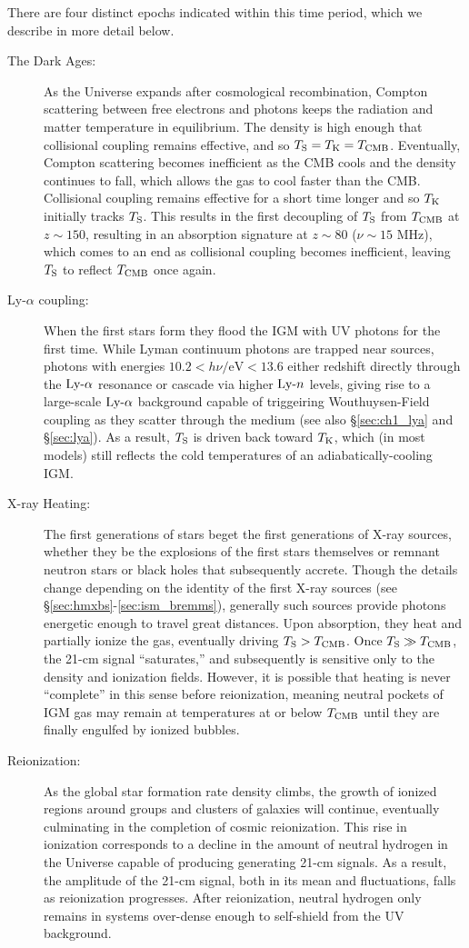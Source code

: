 There are four distinct epochs indicated within this time period, which we describe in more detail below.
\begin{description}
	\item[The Dark Ages:] As the Universe expands after cosmological recombination, Compton scattering between free electrons and photons keeps the radiation and matter temperature in equilibrium. The density is high enough that collisional coupling remains effective, and so $T_{\text{S}} = T_{\text{K}} = T_{\text{CMB}}$. Eventually, Compton scattering becomes inefficient as the CMB cools and the density continues to fall, which allows the gas to cool faster than the CMB. Collisional coupling remains effective for a short time longer and so $T_{\text{K}}$ initially tracks $T_{\text{S}}$. This results in the first decoupling of $T_{\text{S}}$ from $T_{\text{CMB}}$ at $z \sim 150$, resulting in an absorption signature at $z \sim 80$ ($\nu \sim 15$ MHz), which comes to an end as collisional coupling becomes inefficient, leaving $T_{\text{S}}$ to reflect $T_{\text{CMB}}$ once again.
	\item[Ly-$\alpha$ coupling:] When the first stars form they flood the IGM with UV photons for the first time. While Lyman continuum photons are trapped near sources, photons with energies $10.2 < h\nu / \mathrm{eV} < 13.6$ either redshift directly through the $\text{Ly-}\alpha$ resonance or cascade via higher $\text{Ly-}n$ levels, giving rise to a large-scale $\text{Ly-}\alpha$ background capable of triggeiring Wouthuysen-Field coupling as they scatter through the medium (see also \S\ref{sec:ch1_lya} and \S\ref{sec:lya}). As a result, $T_{\text{S}}$ is driven back toward $T_{\text{K}}$, which (in most models) still reflects the cold temperatures of an adiabatically-cooling IGM.
	\item[X-ray Heating:] The first generations of stars beget the first generations of X-ray sources, whether they be the explosions of the first stars themselves or remnant neutron stars or black holes that subsequently accrete. Though the details change depending on the identity of the first X-ray sources (see \S\ref{sec:hmxbs}-\ref{sec:ism_bremms}), generally such sources provide photons energetic enough to travel great distances. Upon absorption, they heat and partially ionize the gas, eventually driving $T_{\text{S}} > T_{\text{CMB}}$. Once $T_{\text{S}} \gg T_{\text{CMB}}$, the 21-cm signal ``saturates,'' and subsequently is sensitive only to the density and ionization fields. However, it is possible that heating is never ``complete'' in this sense before reionization, meaning neutral pockets of IGM gas may remain at temperatures at or below $T_{\text{CMB}}$ until they are finally engulfed by ionized bubbles.
	\item[Reionization:] As the global star formation rate density climbs, the growth of ionized regions around groups and clusters of galaxies will continue, eventually culminating in the completion of cosmic reionization. This rise in ionization corresponds to a decline in the amount of neutral hydrogen in the Universe capable of producing generating 21-cm signals. As a result, the amplitude of the 21-cm signal, both in its mean and fluctuations, falls as reionization progresses. After reionization, neutral hydrogen only remains in systems over-dense enough to self-shield from the UV background.
\end{description}

